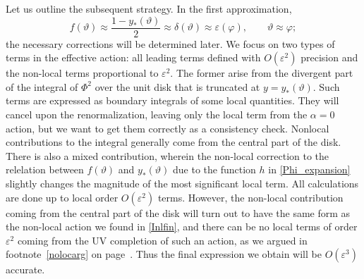 \documentclass[12pt]{article}
\newcommand{\eps}{\varepsilon}
\newcommand{\vth}{\vartheta}
\newcommand{\al}{\alpha}
\newcommand{\de}{\delta}
\newcommand{\vt}{\vartheta}
\newcommand{\vep}{\varepsilon}
\newcommand{\vp}{\varphi}
\begin{document}
Let us outline the subsequent strategy. In the first approximation,
\begin{equation} \label{fapprox}
f(\vth)\approx \frac{1-y_*(\vt)}{2}\approx \de(\vt)\approx \eps(\vp),\qquad 
\vt\approx\vp;
\end{equation}
the necessary corrections will be determined later. We focus on two types of terms in the effective action: all leading terms defined with $O(\vep^2)$ precision and the non-local terms proportional to $\vep^2$. The former arise from the divergent part of the integral of $\Phi^2$ over the unit disk that is truncated at $y=y_*(\vt)$. Such terms are expressed as boundary integrals of some local quantities. They will cancel upon the renormalization, leaving only the local term from the $\al=0$ action, but we want to get them correctly as a consistency check. Nonlocal contributions to the integral generally come from the central part of the disk. There is also a mixed contribution, wherein the non-local correction to the relelation between $f(\vth)$ and $y_*(\vt)$ due to the function $h$ in \eqref{Phi_expansion} slightly changes the magnitude of the most significant local term. All calculations are done up to local order $O(\vep^2)$ terms. However, the non-local contribution coming from the central part of the disk will turn out to have the same form as the non-local action we found in \eqref{Inlfin}, and there can be no local terms of order $\vep^2$ coming from the UV completion of such an action, as we argued in footnote~\ref{nolocarg} on page~\pageref{nolocarg}. Thus the final expression we obtain will be $O(\vep^3)$ accurate.
\end{document}
